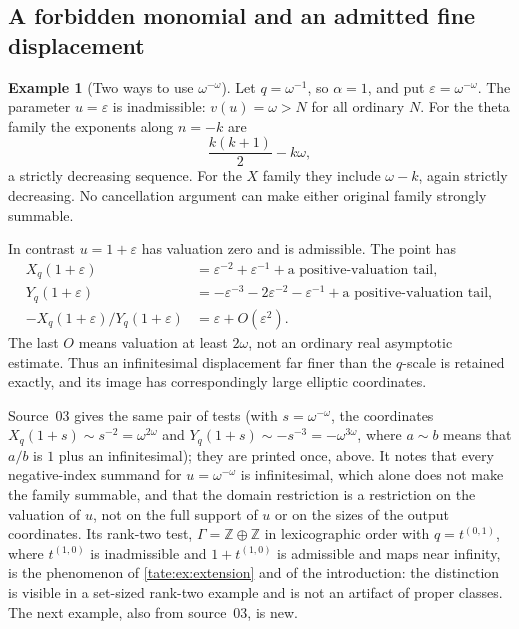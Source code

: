 \documentclass[11pt,letterpaper]{article}
\theoremstyle{definition}
\newtheorem{example}[example]{Example}
\newcommand{\Z}{\mathbb Z}
\begin{document}
\subsection{A forbidden monomial and an admitted fine displacement}

\begin{example}[Two ways to use $\omega^{-\omega}$]\label{tate:ex:omega}
Let $q=\omega^{-1}$, so $\alpha=1$, and put
$\varepsilon=\omega^{-\omega}$. The parameter $u=\varepsilon$ is
inadmissible: $v(u)=\omega>N$ for all ordinary $N$.
For the theta family the exponents along $n=-k$ are
\[
 \frac{k(k+1)}2-k\omega,
\]
a strictly decreasing sequence. For the $X$ family they include
$\omega-k$, again strictly decreasing. No cancellation argument can
make either original family strongly summable.

In contrast $u=1+\varepsilon$ has valuation zero and is admissible.
The point has
\begin{align*}
 X_q(1+\varepsilon)&=\varepsilon^{-2}+\varepsilon^{-1}
                         +\text{a positive-valuation tail},\\
 Y_q(1+\varepsilon)&=-\varepsilon^{-3}-2\varepsilon^{-2}
                         -\varepsilon^{-1}
                         +\text{a positive-valuation tail},\\
 -X_q(1+\varepsilon)/Y_q(1+\varepsilon)
                    &=\varepsilon+O(\varepsilon^2).
\end{align*}
The last $O$ means valuation at least $2\omega$, not an ordinary
real asymptotic estimate. Thus an infinitesimal displacement far finer
than the $q$-scale is retained exactly, and its image has correspondingly
large elliptic coordinates.
\end{example}

Source~03 gives the same pair of tests (with $s=\omega^{-\omega}$, the
coordinates $X_q(1+s)\sim s^{-2}=\omega^{2\omega}$ and
$Y_q(1+s)\sim-s^{-3}=-\omega^{3\omega}$, where $a\sim b$ means that $a/b$
is $1$ plus an infinitesimal); they are printed once, above. It notes that
every negative-index summand for $u=\omega^{-\omega}$ is infinitesimal,
which alone does not make the family summable, and that the domain
restriction is a restriction on the valuation of $u$, not on the full
support of $u$ or on the sizes of the output coordinates. Its rank-two test,
$\Gamma=\Z\oplus\Z$ in lexicographic order with $q=t^{(0,1)}$, where
$t^{(1,0)}$ is inadmissible and $1+t^{(1,0)}$ is admissible and maps near
infinity, is the phenomenon of \cref{tate:ex:extension} and of the
introduction: the distinction is visible in a set-sized rank-two example
and is not an artifact of proper classes. The next example, also from
source~03, is new.
\end{document}
